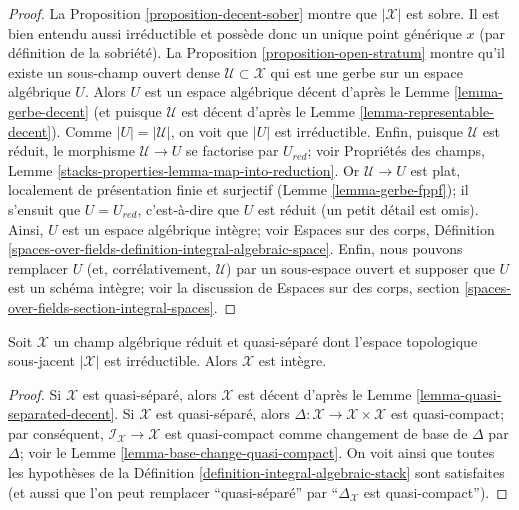 \begin{proof}
La Proposition \ref{proposition-decent-sober} montre que $|\mathcal{X}|$
est sobre. Il est bien entendu aussi irr\'eductible et poss\`ede donc un unique
point g\'en\'erique $x$ (par d\'efinition de la sobri\'et\'e).
La Proposition \ref{proposition-open-stratum} montre
qu'il existe un sous-champ ouvert dense $\mathcal{U} \subset \mathcal{X}$
qui est une gerbe sur un espace alg\'ebrique $U$.
Alors $U$ est un espace alg\'ebrique d\'ecent d'apr\`es le
Lemme \ref{lemma-gerbe-decent} (et puisque $\mathcal{U}$
est d\'ecent d'apr\`es le Lemme \ref{lemma-representable-decent}).
Comme $|U| = |\mathcal{U}|$, on voit que $|U|$ est irr\'eductible.
Enfin, puisque $\mathcal{U}$ est r\'eduit, le morphisme
$\mathcal{U} \to U$ se factorise par $U_{red}$; voir
Propri\'et\'es des champs, Lemme \ref{stacks-properties-lemma-map-into-reduction}.
Or $\mathcal{U} \to U$ est plat, localement de pr\'esentation finie
et surjectif (Lemme \ref{lemma-gerbe-fppf}); il s'ensuit que
$U = U_{red}$, c'est-\`a-dire que $U$ est r\'eduit (un petit d\'etail est omis).
Ainsi, $U$ est un espace alg\'ebrique int\`egre; voir
Espaces sur des corps, D\'efinition
\ref{spaces-over-fields-definition-integral-algebraic-space}.
Enfin, nous pouvons remplacer $U$ (et, corr\'elativement, $\mathcal{U}$)
par un sous-espace ouvert et supposer que $U$ est un sch\'ema int\`egre; voir
la discussion de Espaces sur des corps, section
\ref{spaces-over-fields-section-integral-spaces}.
\end{proof}

\begin{lemma}
\label{lemma-totaro-case}
Soit $\mathcal{X}$ un champ alg\'ebrique r\'eduit et quasi-s\'epar\'e
dont l'espace topologique sous-jacent $|\mathcal{X}|$ est irr\'eductible.
Alors $\mathcal{X}$ est int\`egre.
\end{lemma}

\begin{proof}
Si $\mathcal{X}$ est quasi-s\'epar\'e, alors $\mathcal{X}$ est d\'ecent
d'apr\`es le Lemme \ref{lemma-quasi-separated-decent}.
Si $\mathcal{X}$ est quasi-s\'epar\'e, alors
$\Delta : \mathcal{X} \to \mathcal{X} \times \mathcal{X}$ est quasi-compact;
par cons\'equent, $\mathcal{I}_\mathcal{X} \to \mathcal{X}$ est quasi-compact
comme changement de base de $\Delta$ par $\Delta$; voir le
Lemme \ref{lemma-base-change-quasi-compact}.
On voit ainsi que toutes les hypoth\`eses de la
D\'efinition \ref{definition-integral-algebraic-stack} sont satisfaites
(et aussi que l'on peut remplacer ``quasi-s\'epar\'e'' par
``$\Delta_\mathcal{X}$ est quasi-compact'').
\end{proof}

